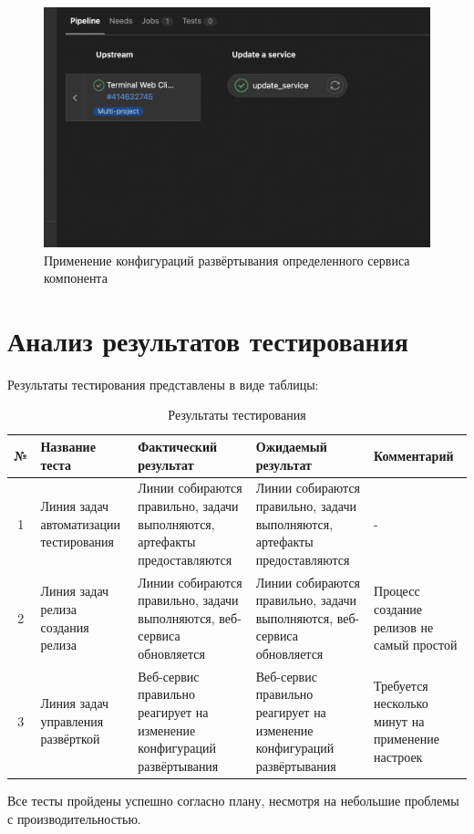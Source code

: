 \begin{enumerate}
    \begin{figure}[ht]
        \centering
        \includegraphics[scale=0.6]{src/figures/qa-deploy-service}
        \caption{Применение конфигураций развёртывания определенного сервиса компонента}
        \label{fig:qa-deploy-service}
    \end{figure}
\end{enumerate}

\section{Анализ результатов тестирования}

Результаты тестирования представлены в виде таблицы:

\begin{center}
    \begin{longtable}{|c|p{}|p{}|p{}|p{}|}
        \caption{Результаты тестирования}
        \label{tab:testing-res}
        \hline
        № & Название теста & Фактический результат & Ожидаемый результат & Комментарий \\
        \hline
        1 & Линия задач автоматизации тестирования  & Линии собираются правильно, задачи выполняются, артефакты предоставляются & Линии собираются правильно, задачи выполняются, артефакты предоставляются & - \\
        \hline
        2 & Линия задач релиза создания релиза  & Линии собираются правильно, задачи выполняются, веб-сервиса обновляется & Линии собираются правильно, задачи выполняются, веб-сервиса обновляется & Процесс создание релизов не самый простой \\
        \hline
        3 & Линия задач управления развёрткой  & Веб-сервис правильно реагирует на изменение конфигураций развёртывания & Веб-сервис правильно реагирует на изменение конфигураций развёртывания & Требуется несколько минут на применение настроек \\
        \hline
    \end{longtable}
\end{center}

Все тесты пройдены успешно согласно плану, несмотря на небольшие проблемы с производительностью.

